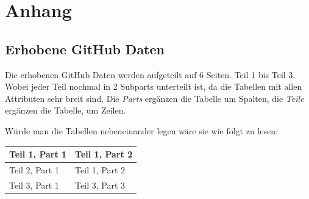 \chapter[Anhang]{Anhang}

\section{Erhobene GitHub Daten}

Die erhobenen GitHub Daten werden aufgeteilt auf 6 Seiten. Teil 1 bis Teil 3. Wobei jeder Teil nochmal in 2 Subparts unterteilt ist,
da die Tabellen mit allen Attributen sehr breit sind. Die \textit{Parts} ergänzen die Tabelle um Spalten, die \textit{Teile} ergänzen die Tabelle, um Zeilen.

Würde man die Tabellen nebeneinander legen wäre sie wie folgt zu lesen:

\begin{table}[h]
    \begin{tabular}{|l|l|}
        \hline
        Teil 1, Part 1 & Teil 1, Part 2 \\ \hline
        Teil 2, Part 1 & Teil 1, Part 2 \\ \hline
        Teil 3, Part 1 & Teil 3, Part 3 \\ \hline
    \end{tabular}%
\end{table}


